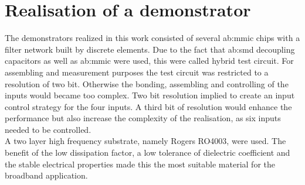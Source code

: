 \chapter{Realisation of a demonstrator}
The demonstrators realized in this work consisted of several \gls{ab:mmic} chips with a filter network built by discrete elements.
Due to the fact that \gls{ab:smd} decoupling capacitors as well as \gls{ab:mmic} were used, this were called hybrid test circuit.
For assembling and measurement purposes the test circuit was restricted to a resolution of two bit.
Otherwise the bonding, assembling and controlling of the inputs would became too complex.
Two bit resolution implied to create an input control strategy for the four inputs.
A third bit of resolution would enhance the performance but also increase the complexity of the realisation, as six inputs needed to be controlled.
\\
A two layer high frequency substrate, namely Rogers RO4003, were used.
The benefit of the low dissipation factor, a low tolerance of dielectric coefficient and the stable electrical properties made this the most suitable material for the broadband application. %

